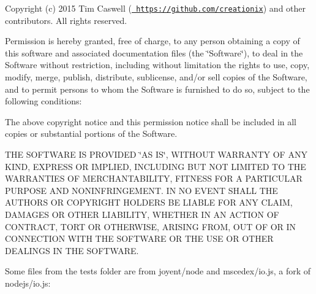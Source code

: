 Copyright (c) 2015 Tim Caswell (\href{https://github.com/creationix}{\texttt{ https\+://github.\+com/creationix}}) and other contributors. All rights reserved.

Permission is hereby granted, free of charge, to any person obtaining a copy of this software and associated documentation files (the \char`\"{}\+Software\char`\"{}), to deal in the Software without restriction, including without limitation the rights to use, copy, modify, merge, publish, distribute, sublicense, and/or sell copies of the Software, and to permit persons to whom the Software is furnished to do so, subject to the following conditions\+:

The above copyright notice and this permission notice shall be included in all copies or substantial portions of the Software.

THE SOFTWARE IS PROVIDED \char`\"{}\+AS IS\char`\"{}, WITHOUT WARRANTY OF ANY KIND, EXPRESS OR IMPLIED, INCLUDING BUT NOT LIMITED TO THE WARRANTIES OF MERCHANTABILITY, FITNESS FOR A PARTICULAR PURPOSE AND NONINFRINGEMENT. IN NO EVENT SHALL THE AUTHORS OR COPYRIGHT HOLDERS BE LIABLE FOR ANY CLAIM, DAMAGES OR OTHER LIABILITY, WHETHER IN AN ACTION OF CONTRACT, TORT OR OTHERWISE, ARISING FROM, OUT OF OR IN CONNECTION WITH THE SOFTWARE OR THE USE OR OTHER DEALINGS IN THE SOFTWARE.

Some files from the tests folder are from joyent/node and mscedex/io.\+js, a fork of nodejs/io.\+js\+:


